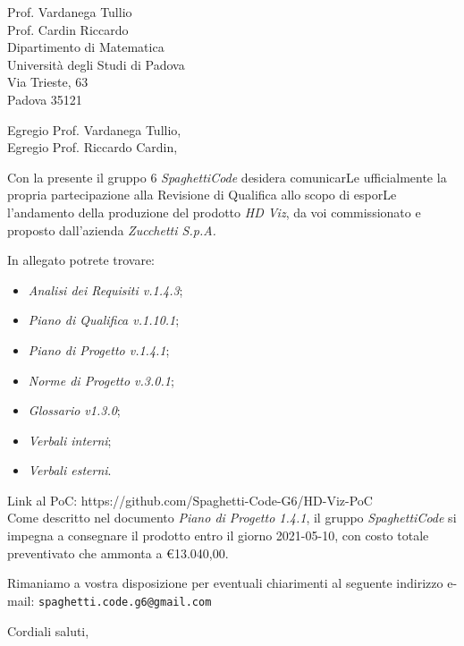 \documentclass[a4paper,12pt]{letteracdp}
\date{16 giugno 2021}
\begin{document}
\begin{letter}{
\vspace*{-2\baselineskip}
Prof. Vardanega Tullio \\
Prof. Cardin Riccardo \\
Dipartimento di Matematica \\
Università degli Studi di Padova \\
Via Trieste, 63 \\
Padova 35121}

\opening{Egregio Prof. Vardanega Tullio, \\
\noindent Egregio Prof. Riccardo Cardin,}

\begin{flushleft}
Con la presente il gruppo 6 \textit{SpaghettiCode} desidera comunicarLe ufficialmente la propria partecipazione alla Revisione di 
Qualifica allo scopo di esporLe l'andamento della produzione del prodotto \textit{HD Viz}, da voi commissionato e proposto 
dall'azienda \textit{Zucchetti S.p.A.}

In allegato potrete trovare:
\end{flushleft}

\begin{itemize}
\item \emph{Analisi dei Requisiti v.1.4.3};
\item \emph{Piano di Qualifica v.1.10.1};
\item \emph{Piano di Progetto v.1.4.1};
\item \emph{Norme di Progetto v.3.0.1};
\item \emph{Glossario v1.3.0};
\item \emph{Verbali interni};
\item \emph{Verbali esterni}.
\end{itemize}

\begin{flushleft}
Link al PoC: https://github.com/Spaghetti-Code-G6/HD-Viz-PoC \\
Come descritto nel documento \emph{Piano di Progetto 1.4.1}, il gruppo \textit{SpaghettiCode} si impegna a consegnare il prodotto entro il 
giorno 2021-05-10, con costo totale preventivato che ammonta a \euro{13.040,00}.

Rimaniamo a vostra disposizione per eventuali chiarimenti al seguente indirizzo e-mail: {\texttt{spaghetti.code.g6@gmail.com}}
\end{flushleft}

\closing{Cordiali saluti,}

\end{letter}
\end{document}
